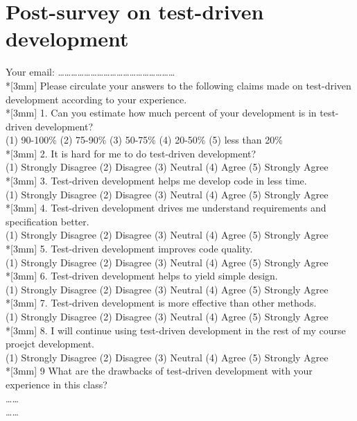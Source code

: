 \chapter{Post-survey on test-driven development}
\label{app:post-survey}
\noindent Your email: \ldots\ldots\ldots\ldots\ldots\ldots\ldots\ldots\ldots\ldots\ldots\ldots\ldots\ldots\dots\ldots\ldots\ldots\\*[3mm]
Please circulate your answers to the following claims made on test-driven
development according to your experience.\\*[3mm]
1. Can you estimate how much percent of your development is in test-driven
development?\\
(1) 90-100\% (2) 75-90\% (3) 50-75\% (4) 20-50\% (5) less than 20\% \\*[3mm]
2. It is hard for me to do test-driven development? \\
(1) Strongly Disagree (2) Disagree (3) Neutral (4) Agree (5) Strongly Agree\\*[3mm]
3. Test-driven development helps me develop code in less time. \\
(1) Strongly Disagree (2) Disagree (3) Neutral (4) Agree (5) Strongly Agree\\*[3mm]
4. Test-driven development drives me understand requirements and
specification better.\\
(1) Strongly Disagree (2) Disagree (3) Neutral (4) Agree (5) Strongly Agree\\*[3mm]
5. Test-driven development improves code quality. \\
(1) Strongly Disagree (2) Disagree (3) Neutral (4) Agree (5) Strongly Agree\\*[3mm]
6. Test-driven development helps to yield simple design.\\
(1) Strongly Disagree (2) Disagree (3) Neutral (4) Agree (5) Strongly Agree\\*[3mm]
7. Test-driven development is more effective than other methods.\\
(1) Strongly Disagree (2) Disagree (3) Neutral (4) Agree (5) Strongly Agree\\*[3mm]
8. I will continue using test-driven development in the rest of my course proejct development. \\
(1) Strongly Disagree (2) Disagree (3) Neutral (4) Agree (5) Strongly Agree\\*[3mm]
9 What are the drawbacks of test-driven development with your experience in
this class?\\
\ldots\dotfill\ldots \\
\ldots\dotfill\ldots

